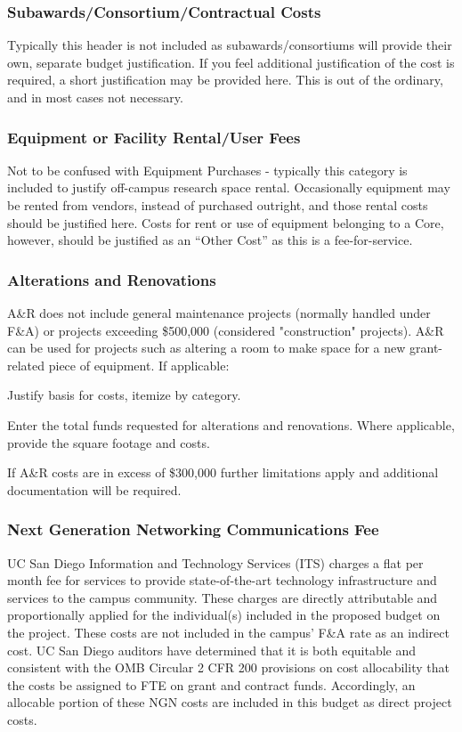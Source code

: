 \documentclass[../main.tex]{subfiles}
\begin{document}
\subsubsection{Subawards/Consortium/Contractual Costs}
Typically this header is not included as subawards/consortiums will provide their own, separate budget justification. 
If you feel additional justification of the cost is required, a short justification may be provided here. 
This is out of the ordinary, and in most cases not necessary.


\subsubsection{Equipment or Facility Rental/User Fees}
 Not to be confused with Equipment Purchases - typically this category is included to justify off-campus research space rental. Occasionally equipment may be rented from vendors, instead of purchased outright, and those rental costs should be justified here. Costs for rent or use of equipment belonging to a Core, however, should be justified as an “Other Cost” as this is a fee-for-service.


\subsubsection{Alterations and Renovations} A\&R does not include general maintenance projects (normally handled under F\&A) or projects exceeding \$500,000 (considered "construction" projects). A\&R can be used for projects such as altering a room to make space for a new grant-related piece of equipment. If applicable:

Justify basis for costs, itemize by category.

Enter the total funds requested for alterations and renovations. Where applicable, provide the square footage and costs.

If A\&R costs are in excess of \$300,000 further limitations apply and additional documentation will be required.


\subsubsection{Next Generation Networking Communications Fee}
UC San Diego Information and Technology Services (ITS) charges a flat per month fee for services to provide state-of-the-art technology infrastructure and services to the campus community.  
These charges are directly attributable and proportionally applied for the individual(s) included in the proposed budget on the project.  
These costs are not included in the campus' F\&A rate as an indirect cost.  
UC San Diego auditors have determined that it is both equitable and consistent with the OMB Circular 2 CFR 200 provisions on cost allocability that the costs be assigned to FTE on grant and contract funds.  
Accordingly, an allocable portion of these NGN costs are included in this budget as direct project costs.
\end{document}
